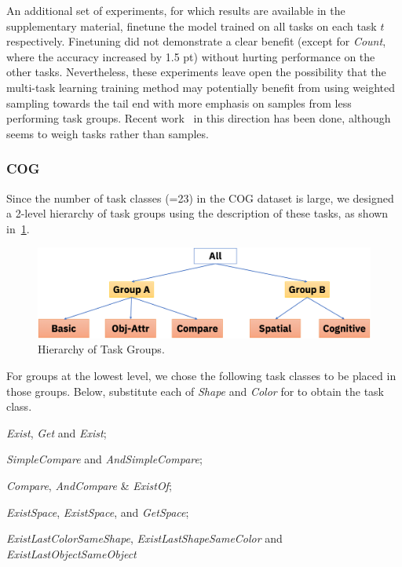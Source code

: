 An additional set of experiments, for which results are available in the supplementary material,
finetune the model trained on all tasks on each task $t$ respectively.
Finetuning did not demonstrate a clear benefit (except for \textit{Count}, where the accuracy increased by 1.5 pt) without hurting performance on the other tasks. Nevertheless, these experiments leave open the possibility that the multi-task learning training method may potentially benefit from using weighted sampling towards the tail end with more emphasis on samples from less performing task groups. Recent work~\cite{guo2018dynamic, kendall2018multi} in this direction has been done, although seems to weigh tasks rather than samples.

\subsubsection{COG}
\label{sec:reasoning-cog}
Since the number of task classes (=23) in the COG dataset is large, we designed a 2-level hierarchy of task groups using the
description of these tasks, as shown in~\cref{fig:task-groups}.

\begin{figure}[htb]
	\centering
	\includegraphics[width=\columnwidth]{img/architecture/hierarchy}
	\caption{Hierarchy of Task Groups.}
	\label{fig:task-groups}
\end{figure}

\bigskip

For groups at the lowest level, we chose the following task classes to be placed in those groups.
Below, substitute each of \textit{Shape} and \textit{Color} for  \uX{} to obtain the task class.
\begin{description}
	\compresslist
	\item[Basic:] \textit{Exist}\uX, \textit{Get}\uX{} and \textit{Exist};
	\item[Obj-Attr:] \emph{SimpleCompare}\uX{} and \textit{AndSimpleCompare}\uX;
	\item[Compare:] \textit{Compare}\uX,  \textit{AndCompare}\uX{} \& \textit{Exist}\uX\textit{Of};
	\item[Spatial:] \textit{ExistSpace}, \textit{Exist}\uX\textit{Space}, and \textit{Get}\uX\textit{Space};
	\item[Cognitive:] \textit{ExistLastColorSameShape}, \textit{ExistLastShapeSameColor} and \textit{ExistLastObjectSameObject}
\end{description}

